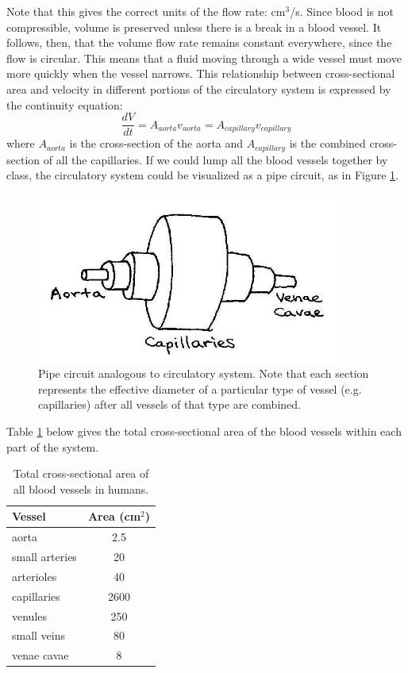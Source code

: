 Note that this gives the correct units of the flow rate: cm$^3$/s. Since blood is not compressible, volume is preserved unless there is a break in a blood vessel.  It follows, then, that the volume flow rate remains constant everywhere, since the flow is circular.  This means that a fluid moving through a wide vessel must move more quickly when the vessel narrows.  This relationship between cross-sectional area and velocity in different portions of the circulatory system is expressed by the continuity equation:
\begin{equation}\label{eqn2-2}
\frac{dV}{dt} = A_{aorta}v_{aorta} = A_{capillary}v_{capillary}
\end{equation}
where $A_{aorta}$ is the cross-section of the aorta and $A_{capillary}$ is the combined cross-section of all the capillaries. If we could lump all the blood vessels together by class, the circulatory system could be visualized as a pipe circuit, as in Figure \ref{Fig2-6}.
\begin{figure}[htb]
	\centering
	\includegraphics[width=4in]{./figures/Topic2/Fig2-6.jpg}
	\caption{Pipe circuit analogous to circulatory system. Note that each section represents the effective diameter of a particular type of vessel (e.g. capillaries) after all vessels of that type are combined.}
	\label{Fig2-6}
\end{figure}
Table \ref{table2-1} below gives the total cross-sectional area of the blood vessels within each part of the system.
\begin{table}[htb]
\begin{center}
\begin{tabular}{|l|c|}
\hline
Vessel & Area (cm$^2$) \\
\hline
aorta & 2.5 \\
small arteries & 20 \\
arterioles & 40 \\
capillaries & 2600 \\
venules & 250 \\
small veins & 80 \\
venae cavae & 8 \\
\hline
\end{tabular}
\caption{Total cross-sectional area of all blood vessels in humans.}
\label{table2-1}
\end{center}
\end{table}
